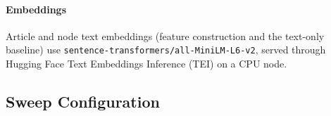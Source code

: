 \paragraph{Embeddings}
Article and node text embeddings (feature construction and the text-only baseline) use
\texttt{sentence-transformers/all-MiniLM-L6-v2}, served through Hugging Face Text Embeddings
Inference (TEI) on a CPU node.
%

\subsection{Sweep Configuration}
\label{sec:sweep-config}

